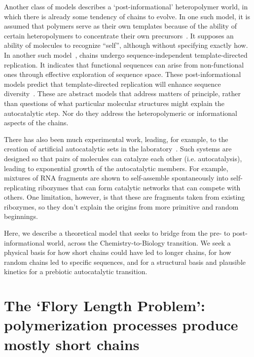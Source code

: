 \documentclass[twocolumn,letterpaper]{revtex4-1}
\begin{document}
 Another class of models describes a `post-informational' heteropolymer world, in which there is 
already some tendency of chains to evolve.  In one such model, it is assumed that polymers serve 
as 
their own templates because of the ability of certain heteropolymers to concentrate their own 
precursors~\cite{nowak2008prevolutionary,Ohtsuki2009,Chen2012,Derr2012}.  It supposes an ability 
of 
molecules to recognize ``self'', although without specifying exactly how.  In another such 
model~\cite{Walker2012}, chains undergo sequence-independent template-directed replication.  It 
indicates that functional sequences can arise from non-functional ones through effective 
exploration of sequence space.  These post-informational models predict that template-directed 
replication will enhance sequence diversity~\cite{Derr2012}.   These are abstract models that 
address matters of principle, rather than questions of what particular molecular structures might 
explain the autocatalytic step. Nor do they address the heteropolymeric or informational aspects 
of 
the chains.
 
 There has also been much experimental work, leading, for example, to the creation of artificial 
autocatalytic sets in the laboratory~\cite{VonKiedrowski1986,Lincoln2009,Vaidya2012}. Such systems 
are designed so that pairs of molecules can catalyze each other (i.e. autocatalysis), leading to 
exponential growth of the autocatalytic members.  For example, mixtures of RNA fragments are shown 
to self-assemble spontaneously into self-replicating ribozymes that can form catalytic networks 
that can compete with others\cite{Robertson2014}.  One limitation, however, is that these are 
fragments 
taken from existing ribozymes, so they don't explain the origins from more primitive and random 
beginnings.
 
  Here, we describe a theoretical model that seeks to bridge from the pre- to post-informational 
world, across the Chemistry-to-Biology transition.  We seek a physical basis for how short chains 
could have led to longer chains, for how random chains led to specific sequences, and for a 
structural basis and plausible kinetics for a prebiotic autocatalytic transition.
   
 \section*{The `Flory Length Problem': polymerization processes produce mostly short chains}
 \label{sec:flory} 
\end{document}
